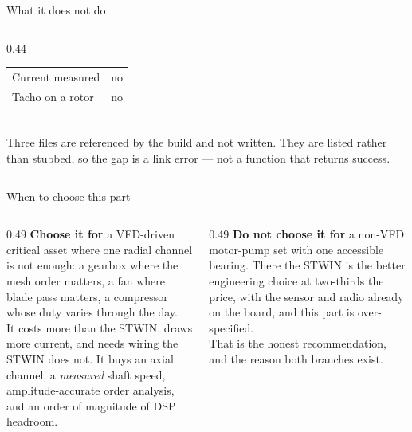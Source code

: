\documentclass[aspectratio=169,10pt]{beamer}
\begin{document}
\begin{frame}{What it does not do}
\begin{columns}[T]
\begin{column}{0.44\textwidth}
\begin{tabular}{@{}ll@{}}
        Current measured          & \textcolor{pdmcrit}{no} \\
        Tacho on a rotor          & \textcolor{pdmcrit}{no} \\
        \bottomrule
      \end{tabular}
      \\[2mm]
      \scriptsize\color{pdmink2}
      Three files are referenced by the build and not written. They are listed
      rather than stubbed, so the gap is a link error --- not a function that
      returns success.
    \end{column}
  \end{columns}
\end{frame}

\begin{frame}{When to choose this part}
  \begin{columns}[T]
    \begin{column}{0.49\textwidth}
      \scriptsize
      \textbf{Choose it for} a VFD-driven critical asset where one radial
      channel is not enough: a gearbox where the mesh order matters, a fan
      where blade pass matters, a compressor whose duty varies through the day.
      \\[2mm]
      It costs more than the STWIN, draws more current, and needs wiring the
      STWIN does not. It buys an axial channel, a \emph{measured} shaft speed,
      amplitude-accurate order analysis, and an order of magnitude of DSP
      headroom.
    \end{column}
    \begin{column}{0.49\textwidth}
      \scriptsize\color{pdmink2}
      \textbf{Do not choose it for} a non-VFD motor-pump set with one
      accessible bearing. There the STWIN is the better engineering choice at
      two-thirds the price, with the sensor and radio already on the board, and
      this part is over-specified.
      \\[2mm]
      That is the honest recommendation, and the reason both branches exist.
    \end{column}
  \end{columns}
\end{frame}
\end{document}
